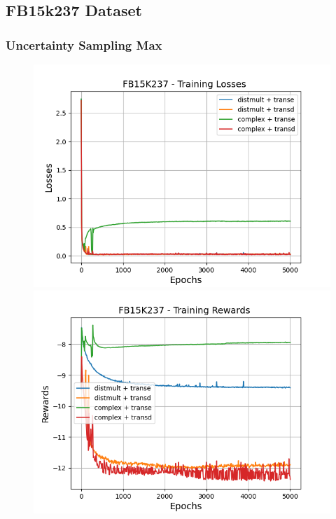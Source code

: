 \subsection{FB15k237 Dataset}

\subsubsection{Uncertainty Sampling Max}

\begin{figure}
    \centering
    \begin{minipage}{.5\textwidth}
      \centering
      \includegraphics[width=0.9\linewidth]{figures/results/gan_train/not_pretrained/uncertainty/max/entropy/fb15k237/gan_train_uncertainty_fb15k237_losses.png}
    \end{minipage}%
    \begin{minipage}{.5\textwidth}
      \centering
      \includegraphics[width=0.9\linewidth]{figures/results/gan_train/not_pretrained/uncertainty/max/entropy/fb15k237/gan_train_uncertainty_fb15k237_rewards.png}

\end{minipage}
\end{figure}
